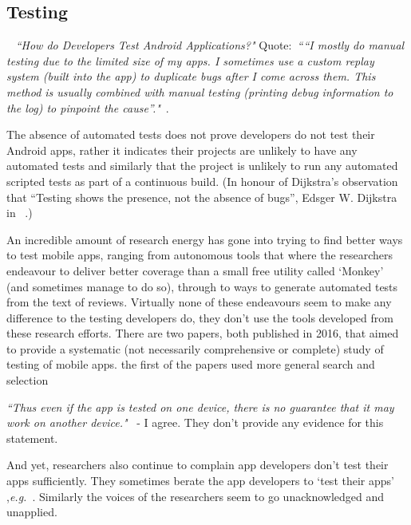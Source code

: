 \subsection{Testing}~\label{rw-testing-topic}
\emph{``How do Developers Test Android Applications?"} Quote:~\emph{``“I mostly do manual testing due to the limited size of my apps. I sometimes use a custom replay system (built into the app) to duplicate bugs after I come across them. This method is usually combined with manual testing (printing debug information to the log) to pinpoint the cause”."}~.

The absence of automated tests does not prove developers do not test their Android apps, rather it indicates their projects are unlikely to have any automated tests and similarly that the project is unlikely to run any automated scripted tests as part of a continuous build. (In honour of Dijkstra's observation that ``Testing shows the presence, not the absence of bugs'', Edsger W. Dijkstra in ~.) %


An incredible amount of research energy has gone into trying to find better ways to test mobile apps, ranging from autonomous tools that where the researchers endeavour to deliver better coverage than a small free utility called `Monkey' (and sometimes manage to do so), through to ways to generate automated tests from the text of reviews. Virtually none of these endeavours seem to make any difference to the testing developers do, they don't use the tools developed from these research efforts. There are two papers, both published in 2016, that aimed to provide a systematic (not necessarily comprehensive or complete) study of testing of mobile apps. the first of the papers used more general search and selection   

\emph{``Thus even if the app is tested on one device, there is no guarantee that it may work on another device."}~ - I agree. They don't provide any evidence for this statement.

And yet, researchers also continue to complain app developers don't test their apps sufficiently. They sometimes berate the app developers to `test their apps' ,\emph{e.g.}~.
Similarly the voices of the researchers seem to go unacknowledged and unapplied.


